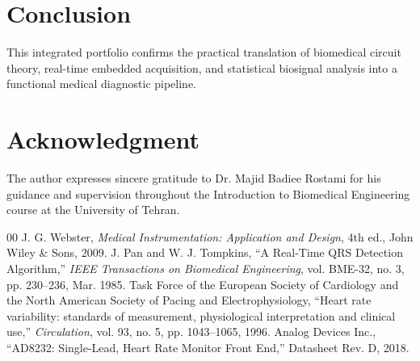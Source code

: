 \documentclass[journal,10pt,twocolumn]{IEEEtran}
\begin{document}
\section{Conclusion}
This integrated portfolio confirms the practical translation of biomedical circuit theory, real-time embedded acquisition, and statistical biosignal analysis into a functional medical diagnostic pipeline.

\section*{Acknowledgment}
The author expresses sincere gratitude to Dr. Majid Badiee Rostami for his guidance and supervision throughout the Introduction to Biomedical Engineering course at the University of Tehran.

\begin{thebibliography}{00}
 J. G. Webster, \textit{Medical Instrumentation: Application and Design}, 4th ed., John Wiley \& Sons, 2009.
 J. Pan and W. J. Tompkins, ``A Real-Time QRS Detection Algorithm,'' \textit{IEEE Transactions on Biomedical Engineering}, vol. BME-32, no. 3, pp. 230--236, Mar. 1985.
 Task Force of the European Society of Cardiology and the North American Society of Pacing and Electrophysiology, ``Heart rate variability: standards of measurement, physiological interpretation and clinical use,'' \textit{Circulation}, vol. 93, no. 5, pp. 1043--1065, 1996.
 Analog Devices Inc., ``AD8232: Single-Lead, Heart Rate Monitor Front End,'' Datasheet Rev. D, 2018.
\end{thebibliography}
\end{document}
